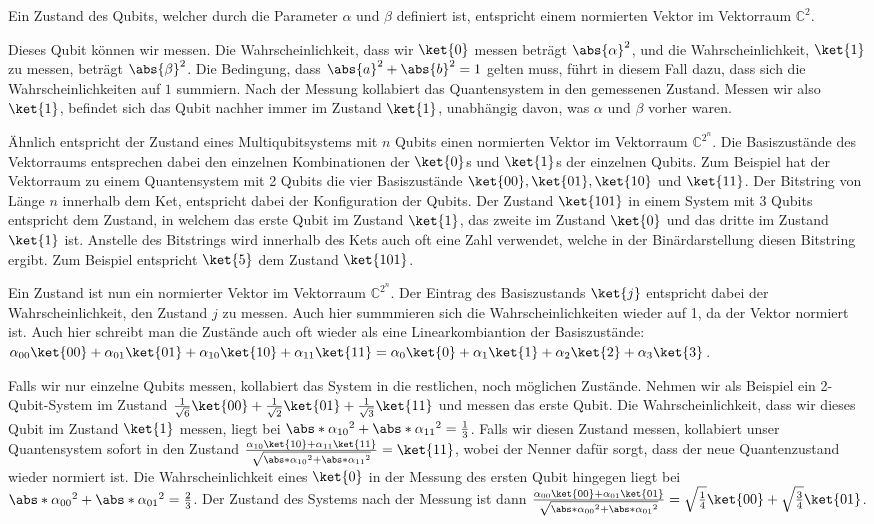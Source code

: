 Ein Zustand des Qubits, welcher durch die Parameter $\alpha$ und $\beta$ definiert ist, entspricht einem normierten Vektor im Vektorraum $\mathbb{C}^2$.

Dieses Qubit können wir messen. Die Wahrscheinlichkeit, dass wir $\ket{0}$ messen beträgt $\abs{\alpha}^2$, und die Wahrscheinlichkeit, $\ket{1}$ zu messen, beträgt $\abs{\beta}^2$. Die Bedingung, dass $\abs{a}^2 + \abs{b}^2 = 1$ gelten muss, führt in diesem Fall dazu, dass sich die Wahrscheinlichkeiten auf $1$ summiern. Nach der Messung kollabiert das Quantensystem in den gemessenen Zustand. Messen wir also $\ket{1}$, befindet sich das Qubit nachher immer im Zustand $\ket{1}$, unabhängig davon, was $\alpha$ und $\beta$ vorher waren.

Ähnlich entspricht der Zustand eines Multiqubitsystems mit $n$ Qubits einen normierten Vektor im Vektorraum $\mathbb{C}^{2^n}$. Die Basiszustände des Vektorraums entsprechen dabei den einzelnen Kombinationen der $\ket{0}$s und $\ket{1}$s der einzelnen Qubits. Zum Beispiel hat der Vektorraum zu einem Quantensystem mit 2 Qubits die vier Basiszustände $\ket{00}, \ket{01}, \ket{10}$ und $\ket{11}$. Der Bitstring von Länge $n$ innerhalb dem Ket, entspricht dabei der Konfiguration der Qubits. Der Zustand $\ket{101}$ in einem System mit 3 Qubits entspricht dem Zustand, in welchem das erste Qubit im Zustand $\ket{1}$, das zweite im Zustand $\ket{0}$ und das dritte im Zustand $\ket{1}$ ist. Anstelle des Bitstrings wird innerhalb des Kets auch oft eine Zahl verwendet, welche in der Binärdarstellung diesen Bitstring ergibt. Zum Beispiel entspricht $\ket{5}$ dem Zustand $\ket{101}$.

Ein Zustand ist nun ein normierter Vektor im Vektorraum $\mathbb{C}^{2^n}$. Der Eintrag des Basiszustands $\ket{j}$ entspricht dabei der Wahrscheinlichkeit, den Zustand $j$ zu messen. Auch hier summmieren sich die Wahrscheinlichkeiten wieder auf 1, da der Vektor normiert ist. Auch hier schreibt man die Zustände auch oft wieder als eine Linearkombiantion der Basiszustände: $\alpha_{00}\ket{00} + \alpha_{01}\ket{01} + \alpha_{10}\ket{10} + \alpha_{11}\ket{11} = \alpha_{0}\ket{0} + \alpha_{1}\ket{1} + \alpha_{2}\ket{2} + \alpha_{3}\ket{3}$.

Falls wir nur einzelne Qubits messen, kollabiert das System in die restlichen, noch möglichen Zustände. Nehmen wir als Beispiel ein 2-Qubit-System im Zustand $\frac{1}{\sqrt{6}}\ket{00} + \frac{1}{\sqrt{2}}\ket{01} + \frac{1}{\sqrt{3}}\ket{11}$ und messen das erste Qubit. Die Wahrscheinlichkeit, dass wir dieses Qubit im Zustand $\ket{1}$ messen, liegt bei $\abs*{\alpha_{10}}^2 + \abs*{\alpha_{11}}^2 = \frac{1}{3}$. Falls wir diesen Zustand messen, kollabiert unser Quantensystem sofort in den Zustand $\frac{\alpha_{10}\ket{10} + \alpha_{11}\ket{11}}{\sqrt{\abs*{\alpha_{10}}^2 + \abs*{\alpha_{11}}^2}} = \ket{11}$, wobei der Nenner dafür sorgt, dass der neue Quantenzustand wieder normiert ist. Die Wahrscheinlichkeit eines $\ket{0}$ in der Messung des ersten Qubit hingegen liegt bei $\abs*{\alpha_{00}}^2 + \abs*{\alpha_{01}}^2 = \frac{2}{3}$. Der Zustand des Systems nach der Messung ist dann $\frac{\alpha_{00}\ket{00} + \alpha_{01}\ket{01}}{\sqrt{\abs*{\alpha_{00}}^2 + \abs*{\alpha_{01}}^2}} = \sqrt{\frac{1}{4}}\ket{00} + \sqrt{\frac{3}{4}}\ket{01}$.

